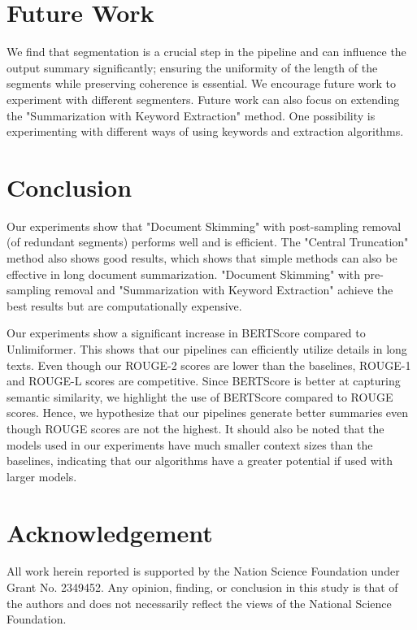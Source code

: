 \documentclass[letterpaper]{article} %
\begin{document}
\section{Future Work}

We find that segmentation is a crucial step in the pipeline and can influence the output summary significantly; ensuring the uniformity of the length of the segments while preserving coherence is essential.
We encourage future work to experiment with different segmenters.
Future work can also focus on extending the "Summarization with Keyword Extraction" method.
One possibility is experimenting with different ways of using keywords and extraction algorithms.


\section{Conclusion}

Our experiments show that "Document Skimming" with post-sampling removal (of redundant segments) performs well and is efficient.
The "Central Truncation" method also shows good results, which shows that simple methods can also be effective in long document summarization.
"Document Skimming" with pre-sampling removal and "Summarization with Keyword Extraction" achieve the best results but are computationally expensive.

Our experiments show a significant increase in BERTScore compared to Unlimiformer.
This shows that our pipelines can efficiently utilize details in long texts.
Even though our ROUGE-2 scores are lower than the baselines, ROUGE-1 and ROUGE-L scores are competitive.
Since BERTScore is better at capturing semantic similarity, we highlight the use of BERTScore compared to ROUGE scores.
Hence, we hypothesize that our pipelines generate better summaries even though ROUGE scores are not the highest.
It should also be noted that the models used in our experiments have much smaller context sizes than the baselines, indicating that our algorithms have a greater potential if used with larger models.


\section*{Acknowledgement}
  
All work herein reported is supported by the Nation Science Foundation under Grant No. 2349452.
Any opinion, finding, or conclusion in this study is that of the authors and does not necessarily reflect the views of the National Science Foundation.



\end{document}
